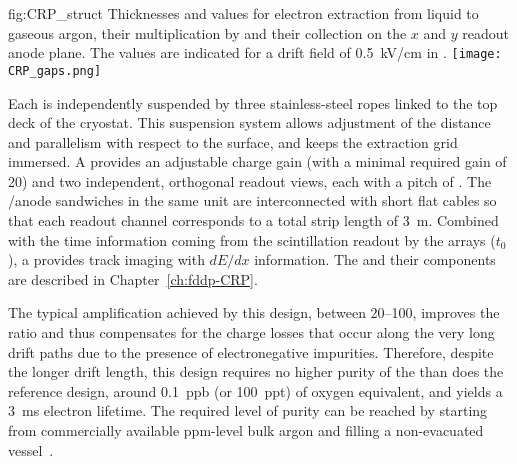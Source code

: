 \begin{dunefigure}{fig:CRP_struct}
{Thicknesses and  values for electron extraction from liquid to gaseous argon, their  multiplication by  and their collection on the $x$ and $y$ readout anode plane. The  values are indicated for a drift field of \SI{0.5}{kV/cm} in \lar.}
\texttt{[image: CRP\_gaps.png]}
\end{dunefigure}

Each  is independently suspended by three stainless-steel ropes linked to the top deck of the cryostat. This suspension system allows adjustment of the  distance and parallelism with respect to the \lar surface, and keeps the extraction grid immersed. A  provides an adjustable charge gain (with a minimal required gain of \num{20}) and two independent, orthogonal readout views, each with a pitch of \dpstrippitch.  The /anode sandwiches  in the same  unit are interconnected with short flat cables so that each readout channel corresponds to a total strip length of \SI{3}{m}. Combined with the time information coming from the \lar scintillation readout by the  arrays ($t_0$), a  provides \threed track imaging with $dE/dx$ information.  The  and their components are described in Chapter~\ref{ch:fddp-CRP}.

The typical amplification achieved by this design, between \numrange{20}{100}, improves the  ratio and thus  compensates for the charge losses that occur along the very long drift paths due to the presence of  electronegative impurities. Therefore, despite the longer drift length, this design requires no higher 
purity of the \lar than does the reference design, around \SI{0.1}{ppb} (or \SI{100}{ppt}) of oxygen equivalent, and yields a \SI{3}{ms} electron lifetime. The required level of purity can be reached by starting from  commercially available ppm-level bulk argon and filling a non-evacuated vessel~\cite{WA105_TDR}.


